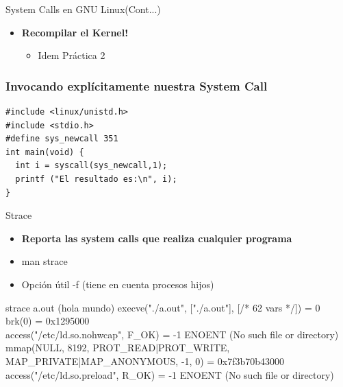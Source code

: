 \begin{frame}{System Calls en GNU Linux(Cont...)}
   \begin{itemize}  
   \item \textbf{Recompilar el Kernel!}
    \begin{itemize}
	 \item Idem Práctica 2 
    \end{itemize}   
 \end{itemize}
\end{frame}


\begin{frame}[fragile]
\frametitle{Invocando explícitamente nuestra System Call}

\begin{lstlisting}
#include <linux/unistd.h>
#include <stdio.h>
#define sys_newcall 351
int main(void) {
  int i = syscall(sys_newcall,1);
  printf ("El resultado es:\n", i);
}
\end{lstlisting}
\end{frame}


\begin{frame}{Strace}
   \begin{itemize}  
    \item \textbf{Reporta las system calls que realiza cualquier programa}
    \item man strace
    \item Opción útil -f (tiene en cuenta procesos hijos)  
 \end{itemize}
\begin{block}{strace a.out (hola mundo)}
execve("./a.out", ["./a.out"], [/* 62 vars */]) = 0 \\
brk(0)                                  = 0x1295000 \\
access("/etc/ld.so.nohwcap", F\_OK)      = -1 ENOENT (No such file or directory)\\
mmap(NULL, 8192, PROT\_READ|PROT\_WRITE, MAP\_PRIVATE|MAP\_ANONYMOUS, -1, 0) = 0x7f3b70b43000\\
access("/etc/ld.so.preload", R\_OK)      = -1 ENOENT (No such file or directory)\\

\end{block}
\end{frame}

